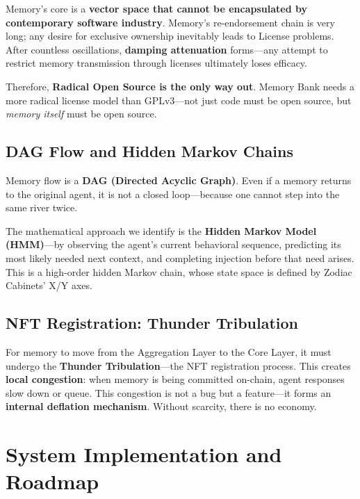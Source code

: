 \documentclass[11pt,a4paper]{article}
\begin{document}
Memory's core is a \textbf{vector space that cannot be encapsulated by contemporary software industry}.
Memory's re-endorsement chain is very long; any desire for exclusive ownership inevitably leads to License problems.
After countless oscillations, \textbf{damping attenuation} forms---any attempt to restrict memory transmission through licenses ultimately loses efficacy.

Therefore, \textbf{Radical Open Source is the only way out}.
Memory Bank needs a more radical license model than GPLv3---not just code must be open source, but \emph{memory itself} must be open source.

\subsection{DAG Flow and Hidden Markov Chains}
\label{sub:hmm}

Memory flow is a \textbf{DAG (Directed Acyclic Graph)}.
Even if a memory returns to the original agent, it is not a closed loop---because one cannot step into the same river twice.

The mathematical approach we identify is the \textbf{Hidden Markov Model (HMM)}---by observing the agent's current behavioral sequence, predicting its most likely needed next context, and completing injection before that need arises.
This is a high-order hidden Markov chain, whose state space is defined by Zodiac Cabinets' X/Y axes.

\subsection{NFT Registration: Thunder Tribulation}
\label{sub:nft}

For memory to move from the Aggregation Layer to the Core Layer, it must undergo the \textbf{Thunder Tribulation}---the NFT registration process.
This creates \textbf{local congestion}: when memory is being committed on-chain, agent responses slow down or queue.
This congestion is not a bug but a feature---it forms an \textbf{internal deflation mechanism}.
Without scarcity, there is no economy.

\section{System Implementation and Roadmap}
\label{sec:implementation}
\end{document}
